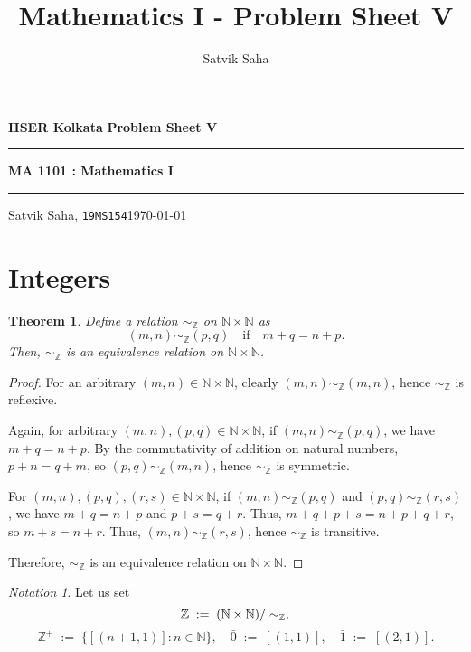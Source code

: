 \documentclass[10pt]{article}
\title{Mathematics I - Problem Sheet V}
\author{Satvik Saha}
\date{}
\newtheorem{theorem}{Theorem}[section]
\theoremstyle{definition}
\theoremstyle{remark}
\newtheorem*{notation}{Notation}
\begin{document}
        \par\textbf{IISER Kolkata} \hfill \textbf{Problem Sheet V}
        \vspace{3pt}
        \hrule
        \vspace{3pt}
        \begin{center}
                \LARGE{\textbf{MA 1101 : Mathematics I}}
        \end{center}
        \vspace{3pt}
        \hrule
        \vspace{3pt}
        Satvik Saha, \texttt{19MS154}\hfill\today
        \vspace{20pt}

        \section{Integers}
        \begin{theorem}
        Define a relation $\sim_\mathbb{Z}$ on $\mathbb{N}\times \mathbb{N}$ as
        \[(m, n) \sim_\mathbb{Z} (p, q) \quad\text{if}\quad m + q = n + p. \]
        Then, $\sim_\mathbb{Z}$ is an equivalence relation on $\mathbb{N}\times \mathbb{N}$.
        \end{theorem}
        \begin{proof}
                For an arbitrary $(m, n) \in \mathbb{N}\times \mathbb{N}$, clearly $(m, n) \sim_\mathbb{Z} (m, n)$, hence $\sim_\mathbb{Z} $ is reflexive.

                Again, for arbitrary $(m, n), (p, q) \in \mathbb{N}\times \mathbb{N}$, if
                $(m, n) \sim_\mathbb{Z} (p, q)$, we have $m + q = n + p$.
                By the commutativity of addition on natural numbers, $p + n = q + m$, so 
                $(p, q) \sim_\mathbb{Z} (m, n) $, hence $\sim_\mathbb{Z}$ is symmetric.

                For $(m, n), (p, q), (r, s) \in \mathbb{N}\times \mathbb{N}$, if
                $(m, n) \sim_{\mathbb{Z}} (p, q)$ and $(p, q) \sim_{\mathbb{Z}} (r, s)$, we have
                $m + q = n + p$ and $p + s = q + r$. Thus, 
                $m + q + p + s = n + p + q + r$, so $m + s = n + r$.
                Thus, $(m, n) \sim_{\mathbb{Z}} (r, s)$, hence $\sim_{\mathbb{Z}}$ is transitive.

                Therefore, $\sim_{\mathbb{Z}}$ is an equivalence relation on $\mathbb{N}\times \mathbb{N}$.
        \end{proof}

        \begin{notation}
        Let us set
        \[
                \mathbb{Z} \;:=\; (\mathbb{N} \times \mathbb{N})/\sim_\mathbb{Z},\\
        \]
        \[
                \mathbb{Z}^+ \;:=\; \{[(n + 1, 1)] : n \in \mathbb{N}\}, \quad
                \bar{0} \;:=\; [(1, 1)], \quad
                \bar{1} \;:=\; [(2, 1)].
        \]
        \end{notation}
\end{document}
